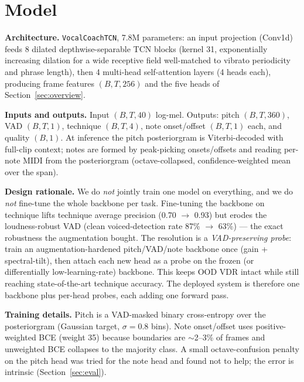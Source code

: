 \documentclass{article}
\begin{document}
\section{Model}\label{sec:model}

\textbf{Architecture.} \texttt{VocalCoachTCN}, 7.8M parameters: an input projection
(Conv1d) feeds 8 dilated depthwise-separable TCN blocks (kernel 31, exponentially
increasing dilation for a wide receptive field well-matched to vibrato periodicity and
phrase length), then 4 multi-head self-attention layers (4 heads each), producing frame
features $(B, T, 256)$ and the five heads of Section~\ref{sec:overview}.

\textbf{Inputs and outputs.} Input $(B, T, 40)$ log-mel. Outputs: pitch $(B, T, 360)$,
VAD $(B, T, 1)$, technique $(B, T, 4)$, note onset/offset $(B, T, 1)$ each, and quality
$(B, 1)$. At inference the pitch posteriorgram is Viterbi-decoded with full-clip
context; notes are formed by peak-picking onsets/offsets and reading per-note MIDI from
the posteriorgram (octave-collapsed, confidence-weighted mean over the span).

\textbf{Design rationale.} We do \emph{not} jointly train one model on everything, and
we do \emph{not} fine-tune the whole backbone per task. Fine-tuning the backbone on
technique lifts technique average precision (0.70 $\to$ 0.93) but erodes the
loudness-robust VAD (clean voiced-detection rate 87\% $\to$ 63\%) --- the exact
robustness the augmentation bought. The resolution is a \emph{VAD-preserving probe}:
train an augmentation-hardened pitch/VAD/note backbone once (gain + spectral-tilt),
then attach each new head as a probe on the frozen (or differentially low-learning-rate)
backbone. This keeps OOD VDR intact while still reaching state-of-the-art technique
accuracy. The deployed system is therefore one backbone plus per-head probes, each
adding one forward pass.

\textbf{Training details.} Pitch is a VAD-masked binary cross-entropy over the
posteriorgram (Gaussian target, $\sigma = 0.8$ bins). Note onset/offset uses
positive-weighted BCE (weight 35) because boundaries are $\sim$2--3\% of frames and
unweighted BCE collapses to the majority class. A small
octave-confusion penalty on the pitch head was tried for the note head and found not
to help; the error is intrinsic (Section~\ref{sec:eval}).

\end{document}
